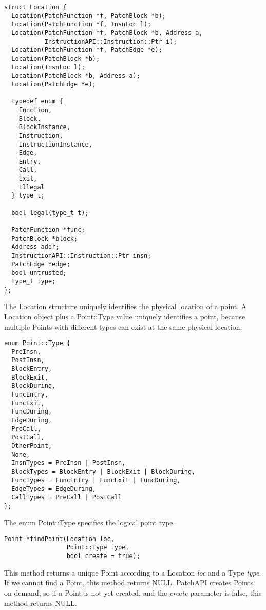 \begin{verbatim}
struct Location {
  Location(PatchFunction *f, PatchBlock *b);
  Location(PatchFunction *f, InsnLoc l);
  Location(PatchFunction *f, PatchBlock *b, Address a,
           InstructionAPI::Instruction::Ptr i);
  Location(PatchFunction *f, PatchEdge *e);
  Location(PatchBlock *b);
  Location(InsnLoc l);
  Location(PatchBlock *b, Address a);
  Location(PatchEdge *e);

  typedef enum {
    Function,
    Block,
    BlockInstance,
    Instruction,
    InstructionInstance,
    Edge,
    Entry,
    Call,
    Exit,
    Illegal
  } type_t;

  bool legal(type_t t);

  PatchFunction *func;
  PatchBlock *block;
  Address addr;
  InstructionAPI::Instruction::Ptr insn;
  PatchEdge *edge;
  bool untrusted;
  type_t type;
};

\end{verbatim}



The Location structure uniquely identifies the physical location of a point.  A
Location object plus a Point::Type value uniquely identifies a point, because
multiple Points with different types can exist at the same physical location.


\begin{verbatim}
enum Point::Type {
  PreInsn,
  PostInsn,
  BlockEntry,
  BlockExit,
  BlockDuring,
  FuncEntry,
  FuncExit,
  FuncDuring,
  EdgeDuring,
  PreCall,
  PostCall,
  OtherPoint,
  None,
  InsnTypes = PreInsn | PostInsn,
  BlockTypes = BlockEntry | BlockExit | BlockDuring,
  FuncTypes = FuncEntry | FuncExit | FuncDuring,
  EdgeTypes = EdgeDuring,
  CallTypes = PreCall | PostCall
};

\end{verbatim}



The enum Point::Type specifies the logical point type.


\begin{verbatim}
Point *findPoint(Location loc,
                 Point::Type type,
                 bool create = true);

\end{verbatim}



This method returns a unique Point according to a Location \emph{loc} and a Type
\emph{type}. If we cannot find a Point, this method returns NULL. PatchAPI creates
Points on demand, so if a Point is not yet created, and the \emph{create} parameter
is false, this method returns NULL.


